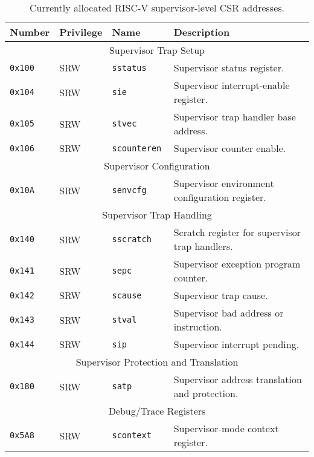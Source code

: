 \begin{table}[htb!]
\begin{center}
\begin{tabular}{|l|l|l|l|}
\hline
Number    & Privilege & Name & Description \\
\hline
\multicolumn{4}{|c|}{Supervisor Trap Setup} \\
\hline
\tt 0x100 & SRW  &\tt sstatus    & Supervisor status register. \\
\tt 0x104 & SRW  &\tt sie        & Supervisor interrupt-enable register. \\
\tt 0x105 & SRW  &\tt stvec      & Supervisor trap handler base address. \\
\tt 0x106 & SRW  &\tt scounteren & Supervisor counter enable. \\
\hline
\multicolumn{4}{|c|}{Supervisor Configuration} \\
\hline
\tt 0x10A & SRW  &\tt senvcfg    & Supervisor environment configuration register. \\
\hline
\multicolumn{4}{|c|}{Supervisor Trap Handling} \\
\hline
\tt 0x140 & SRW  &\tt sscratch   & Scratch register for supervisor trap handlers. \\
\tt 0x141 & SRW  &\tt sepc       & Supervisor exception program counter. \\
\tt 0x142 & SRW  &\tt scause     & Supervisor trap cause. \\
\tt 0x143 & SRW  &\tt stval      & Supervisor bad address or instruction. \\
\tt 0x144 & SRW  &\tt sip        & Supervisor interrupt pending. \\
\hline
\multicolumn{4}{|c|}{Supervisor Protection and Translation} \\
\hline
\tt 0x180 & SRW  &\tt satp       & Supervisor address translation and protection. \\
\hline
\multicolumn{4}{|c|}{Debug/Trace Registers} \\
\hline
\tt 0x5A8 & SRW &\tt scontext & Supervisor-mode context register. \\
\hline
\end{tabular}
\end{center}
\caption{Currently allocated RISC-V supervisor-level CSR addresses.}
\label{scsrnames}
\end{table}

